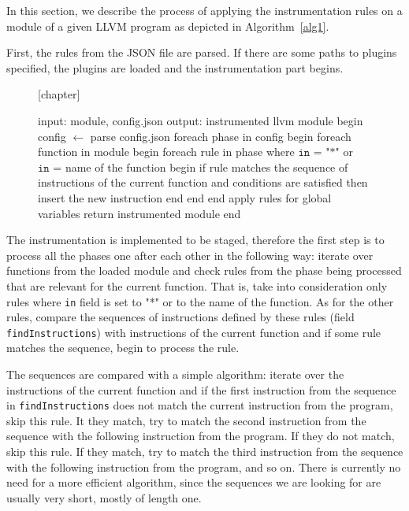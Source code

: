 In this section, we describe the process of applying the instrumentation rules
on a module of a given LLVM program as depicted in
Algorithm~\ref{alg1}.


First, the rules from the JSON file are parsed. If there are some paths to
plugins specified, the plugins are loaded and the instrumentation part begins.

\begin{figure}[t]
[chapter] %

\begin{algorithm}[caption={Applying the instrumentation rules.}, label={alg1},columns=fullflexible]
 input: module, config.json
 output: instrumented llvm module
 begin
   config $\gets$ parse config.json
   foreach phase in config
   begin
      foreach function in module
      begin
         foreach rule in phase where $\texttt{in = "*"}$ or $\texttt{in =}$ name of the function
         begin
            if rule matches the sequence of instructions of the current function
               and conditions are satisfied then insert the new instruction
         end
      end
   end
   apply rules for global variables
   return instrumented module
 end
\end{algorithm}
\end{figure}

The instrumentation is implemented to be staged, therefore the first step is to
process all the phases one after each other in the following way: iterate over
functions from the loaded module and check rules from the phase being processed
that are relevant for the current function. That is, take into consideration
only rules where \texttt{in} field is set to "*" or to the name of the
function.  As for the other rules, compare the
sequences of instructions defined by these rules (field
\texttt{findInstructions}) with instructions of the current function and if
some rule matches the sequence, begin to process the rule.

The sequences are compared with a simple algorithm: iterate over the
instructions of the current function and if the first instruction from the
sequence in \texttt{findInstructions} does not match the current instruction
from the program, skip this rule. It they match, try to match the second
instruction from the sequence with the following instruction from the program.
If they do not match, skip this rule. If they match, try to match the third
instruction from the sequence with the following instruction from the program,
and so on. There is currently no need for a more efficient algorithm, since the
sequences we are looking for are usually very short, mostly of length one.


